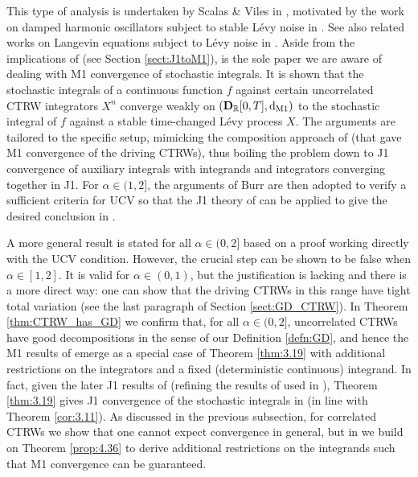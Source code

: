\documentclass[11pt]{article}
\theoremstyle{definition}\newtheorem{example}[theorem]{Example}
\theoremstyle{definition}\newtheorem{counterexample}[theorem]{Counterexample}
\theoremstyle{definition}\newtheorem{remark}[theorem]{Remark}
\theoremstyle{definition}\newtheorem{defi}[theorem]{Definition}
\numberwithin{equation}{section}
\newcommand{\R}{\mathbb{R}}
\newcommand{\D}{{\bf D}}											%
\newcommand*\diff{\mathop{}\!\mathrm{d}}								%
\renewcommand{\|}{\; : \, \;}											%
\newcommand{\dM}{\diff_{\operatorname{M1}}}							%
\begin{document}
This type of analysis is undertaken by Scalas \& Viles in \cite{scalas}, motivated by the work on damped harmonic oscillators subject to stable L\'evy noise in \cite{Sokolev_Ebeling_Dybiec}. See also related works on Langevin equations subject to L\'evy noise in \cite{Hintze_Pavlyukevich,Kulik_Pavlyukevich}. Aside from the implications of \cite{jakubowski} (see Section \ref{sect:J1toM1}), \cite{scalas} is the sole paper we are aware of dealing with M1 convergence of stochastic integrals. It is shown that the stochastic integrals of a continuous function $f$ against certain uncorrelated CTRW integrators $X^n$ converge weakly on $(\D_{\R}[0,T],\dM )$ to the stochastic integral of $f$ against a stable time-changed L\'evy process $X$. The arguments are tailored to the specific setup, mimicking the composition approach of \cite{Becker-Kern} (that gave M1 convergence of the driving CTRWs), thus boiling the problem down to J1 convergence of auxiliary integrals with integrands and integrators converging together in J1. For $\alpha \in (1,2]$, the arguments of Burr \cite{Burr} are then adopted to verify a sufficient criteria for UCV so that the J1 theory of \cite{kurtzprotter} can be applied to give the desired conclusion in \cite[Thm.~4.15]{scalas}.


A more general result \cite[Thm.~4.20]{scalas} is stated for all $\alpha \in (0,2]$ based on a proof working directly with the UCV condition. However, the crucial step \cite[Eq.~(62)]{scalas} can be shown to be false when $\alpha\in [1,2]$. It is valid for $\alpha \in (0,1) $, but the justification is lacking and there is a more direct way: one can show that the driving CTRWs in this range have tight total variation (see the last paragraph of Section \ref{sect:GD_CTRW}). In Theorem \ref{thm:CTRW_has_GD} we confirm that, for all $\alpha \in (0,2]$, uncorrelated CTRWs have good decompositions in the sense of our Definition \ref{defn:GD}, and hence the M1 results of \cite{scalas} emerge as a special case of Theorem \ref{thm:3.19} with additional restrictions on the integrators and a fixed (deterministic continuous) integrand. In fact, given the later J1 results of \cite{henry_straka} (refining the results of \cite{meerschaert} used in \cite{scalas}), Theorem \ref{thm:3.19} gives J1 convergence of the stochastic integrals in \cite{scalas} (in line with Theorem \ref{cor:3.11}). As discussed in the previous subsection, for correlated CTRWs we show that one cannot expect convergence in general, but in \cite{andreasfabrice_applications} we build on Theorem \ref{prop:4.36} to derive additional restrictions on the integrands such that M1 convergence can be guaranteed.
\end{document}
